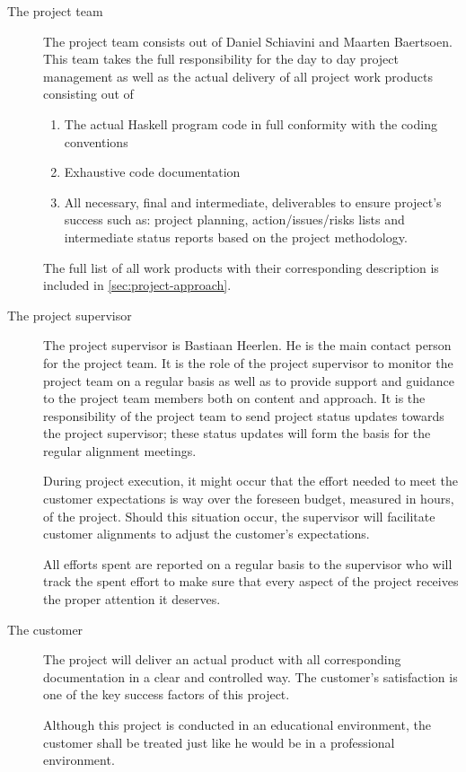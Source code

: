 \begin{description}
	\item[The project team]
	The project team consists out of Daniel Schiavini and Maarten Baertsoen.
	This team takes the full responsibility for the day to day project management as well as the actual delivery of all project work products consisting out of
	\begin{enumerate}
		\item The actual Haskell program code in full conformity with the coding conventions
		\item Exhaustive code documentation
		\item All necessary, final and intermediate, deliverables to ensure project's success such as: project planning, action/issues/risks lists and intermediate status reports based on the project methodology.
	\end {enumerate}
	The full list of all work products with their corresponding description is included in \autoref{sec:project-approach}.
	
	\item[The project supervisor]
	The project supervisor is Bastiaan Heerlen.
	He is the main contact person for the project team.
	It is the role of the project supervisor to monitor the project team on a regular basis as well as to provide support and guidance to the project team members both on content and approach.
	It is the responsibility of the project team to send project status updates towards the project supervisor; these status updates will form the basis for the regular alignment meetings.

	During project execution, it might occur that the effort needed to meet the customer expectations is way over the foreseen budget, measured in hours, of the project.
	Should this situation occur, the supervisor will facilitate customer alignments to adjust the customer's expectations.

	All efforts spent are reported on a regular basis to the supervisor who will track the spent effort to make sure that every aspect of the project receives the proper attention it deserves.

	\item[The customer]
	The project will deliver an actual product with all corresponding documentation in a clear and controlled way.
	The customer's satisfaction is one of the key success factors of this project.

	Although this project is conducted in an educational environment, the customer shall be treated just like he would be in a professional environment.


\end{description}
